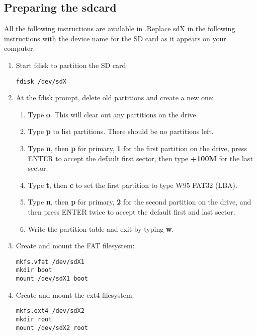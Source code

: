 \documentclass[journal,12pt,twocolumn]{IEEEtran}
\begin{document}
\subsection{Preparing the sdcard}
All the following instructions are available in \cite{alarm_off}.Replace sdX in the following instructions with the device name for the SD card as it appears on your computer.
\begin{enumerate}[1.]
\item Start fdisk to partition the SD card:
\begin{lstlisting}
fdisk /dev/sdX
\end{lstlisting}
\item At the fdisk prompt, delete old partitions and create a new one:
\begin{enumerate}
\item Type \textbf{o}. This will clear out any partitions on the drive.
\item  Type \textbf{p} to list partitions. There should be no partitions left.
\item Type \textbf{n}, then \textbf{p} for primary, \textbf{1} for the first partition on the drive, press ENTER to accept the default first sector, then type \textbf{+100M} for the last sector.
\item Type \textbf{t}, then \textbf{c} to set the first partition to type W95 FAT32 (LBA).
\item Type \textbf{n}, then \textbf{p} for primary, \textbf{2} for the second partition on the drive, and then press ENTER twice to accept the default first and last sector.
\item Write the partition table and exit by typing \textbf{w}.

\end{enumerate}
\item Create and mount the FAT filesystem:
\begin{lstlisting}
mkfs.vfat /dev/sdX1
mkdir boot
mount /dev/sdX1 boot
\end{lstlisting}
\item Create and mount the ext4 filesystem:
\begin{lstlisting}
mkfs.ext4 /dev/sdX2
mkdir root
mount /dev/sdX2 root
\end{lstlisting}
\end{enumerate}
\end{document}
